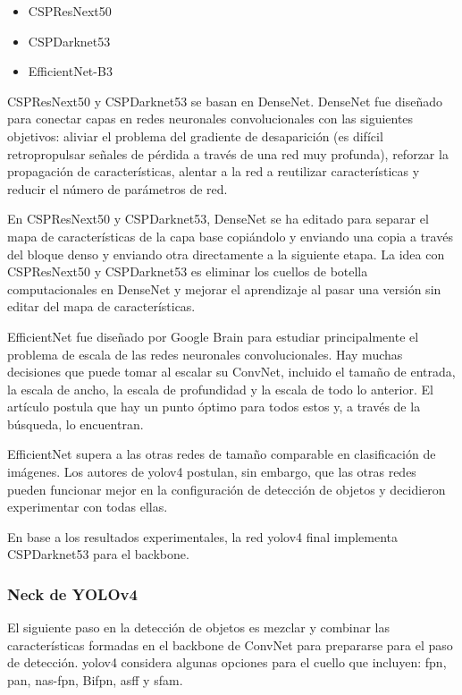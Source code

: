 \begin{itemize}
    \item CSPResNext50
    \item CSPDarknet53
    \item EfficientNet-B3
\end{itemize}

CSPResNext50 y CSPDarknet53 se basan en DenseNet. DenseNet fue diseñado para conectar capas en redes neuronales convolucionales con las siguientes objetivos: aliviar el problema del gradiente de desaparición (es difícil retropropulsar señales de pérdida a través de una red muy profunda), reforzar la propagación de características, alentar a la red a reutilizar características y reducir el número de parámetros de red.

En CSPResNext50 y CSPDarknet53, DenseNet se ha editado para separar el mapa de características de la capa base copiándolo y enviando una copia a través del bloque denso y enviando otra directamente a la siguiente etapa. La idea con CSPResNext50 y CSPDarknet53 es eliminar los cuellos de botella computacionales en DenseNet y mejorar el aprendizaje al pasar una versión sin editar del mapa de características.

EfficientNet fue diseñado por Google Brain para estudiar principalmente el problema de escala de las redes neuronales convolucionales. Hay muchas decisiones que puede tomar al escalar su ConvNet, incluido el tamaño de entrada, la escala de ancho, la escala de profundidad y la escala de todo lo anterior. El artículo \cite{tan2020efficientdet} postula que hay un punto óptimo para todos estos y, a través de la búsqueda, lo encuentran.

EfficientNet supera a las otras redes de tamaño comparable en clasificación de imágenes. Los autores de \gls{yolov4} postulan, sin embargo, que las otras redes pueden funcionar mejor en la configuración de detección de objetos y decidieron experimentar con todas ellas.

En base a los resultados experimentales, la red \gls{yolov4} final implementa CSPDarknet53 para el backbone.

\subsubsection*{Neck de YOLOv4}
\label{subsubsec:yolov4-neck}

El siguiente paso en la detección de objetos es mezclar y combinar las características formadas en el backbone de ConvNet para prepararse para el paso de detección. \gls{yolov4} considera algunas opciones para el cuello que incluyen: \gls{fpn}, \gls{pan}, \gls{nas}-\gls{fpn}, Bi\gls{fpn}, \gls{asff} y \gls{sfam}.


